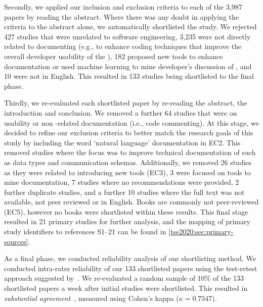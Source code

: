 Secondly, we applied our inclusion and exclusion criteria to each of the 3,987 papers by reading the abstract. Where there was any doubt in applying the criteria to the abstract alone, we automatically shortlisted the study. We rejected 427 studies that were unrelated to software engineering, 3,235 were not directly related to documenting  (e.g., to enhance coding techniques that improve the overall developer usability of the ), 182 proposed new tools to enhance  documentation or used machine learning to mine developer's discussion of , and 10 were not in English. This resulted in 133 studies being shortlisted to the final phase.

Thirdly, we re-evaluated each shortlisted paper by re-reading the abstract, the introduction and conclusion. We removed a further 64 studies that were on  usability or non -related  documentation (i.e., code commenting). At this stage, we decided to refine our exclusion criteria to better match the research goals of this study by including the word `natural language' documentation in EC2. This removed studies where the focus was to improve technical documentation of  such as data types and communication schemas. Additionally, we removed 26 studies as they were related to introducing new tools (EC3), 3 were focused on tools to mine  documentation, 7 studies where no recommendations were provided, 2 further duplicate studies, and a further 10 studies where the full text was not available, not peer reviewed or in English. Books are commonly not peer-reviewed (EC5), however no books were shortlisted within these results. This final stage resulted in 21 primary studies for further analysis, and the mapping of primary study identifiers to references S1--21 can be found in \cref{tse2020:sec:primary-sources}.

As a final phase, we conducted reliability analysis of our shortlisting method. We conducted intra-rater reliability of our 133 shortlisted papers using the test-retest approach suggested by~\citet{Kitchenham:2007dd}. We re-evaluated a random sample of 10\% of the 133 shortlisted papers a week after initial studies were shortlisted. This resulted in \textit{substantial agreement}~\citep{Landis:1977kv}, measured using Cohen's kappa ($\kappa=0.7547$).

